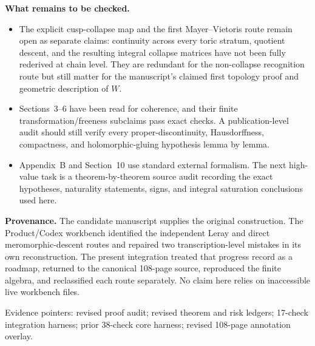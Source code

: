 \documentclass[9pt,letterpaper]{extarticle}
\begin{document}
\textbf{What remains to be checked.}
\begin{itemize}
  \item The explicit cusp-collapse map and the first Mayer--Vietoris route remain open as separate claims: continuity across every toric stratum, quotient descent, and the resulting integral collapse matrices have not been fully rederived at chain level.  They are redundant for the non-collapse recognition route but still matter for the manuscript's claimed first topology proof and geometric description of $W$.
  \item Sections~3--6 have been read for coherence, and their finite transformation/freeness subclaims pass exact checks.  A publication-level audit should still verify every proper-discontinuity, Hausdorffness, compactness, and holomorphic-gluing hypothesis lemma by lemma.
  \item Appendix~B and Section~10 use standard external formalism.  The next high-value task is a theorem-by-theorem source audit recording the exact hypotheses, naturality statements, signs, and integral saturation conclusions used here.
\end{itemize}

\textbf{Provenance.}
The candidate manuscript supplies the original construction.  The Product/Codex workbench identified the independent Leray and direct meromorphic-descent routes and repaired two transcription-level mistakes in its own reconstruction.  The present integration treated that progress record as a roadmap, returned to the canonical 108-page source, reproduced the finite algebra, and reclassified each route separately.  No claim here relies on inaccessible live workbench files.

\vfill
{\footnotesize Evidence pointers: revised proof audit; revised theorem and risk ledgers; 17-check integration harness; prior 38-check core harness; revised 108-page annotation overlay.}
\end{document}
